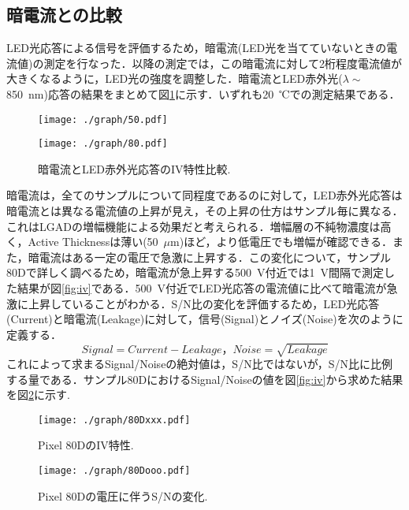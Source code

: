 \subsection{暗電流との比較}
\label{sub:leak}
LED光応答による信号を評価するため，暗電流(LED光を当てていないときの電流値)の測定を行なった．以降の測定では，この暗電流に対して2桁程度電流値が大きくなるように，LED光の強度を調整した．暗電流とLED赤外光($\lambda\sim$850~nm)応答の結果をまとめて図\ref{fig:leak}に示す．いずれも20~℃での測定結果である．\par
\begin{figure}[H]
\begin{minipage}{0.5\hsize}
	\centering
	\texttt{[image: ./graph/50.pdf]}
\end{minipage}
\begin{minipage}{0.5\hsize}
	\centering
	\texttt{[image: ./graph/80.pdf]}
\end{minipage}
 	\caption{暗電流とLED赤外光応答のIV特性比較.}
	\label{fig:leak}
\end{figure}
暗電流は，全てのサンプルについて同程度であるのに対して，LED赤外光応答は暗電流とは異なる電流値の上昇が見え，その上昇の仕方はサンプル毎に異なる．これはLGADの増幅機能による効果だと考えられる．増幅層の不純物濃度は高く，Active Thicknessは薄い(50~$\mu$m)ほど，より低電圧でも増幅が確認できる．また，暗電流はある一定の電圧で急激に上昇する．この変化について，サンプル80Dで詳しく調べるため，暗電流が急上昇する500~V付近では1~V間隔で測定した結果が図\ref{fig:iv}である．500~V付近でLED光応答の電流値に比べて暗電流が急激に上昇していることがわかる．S/N比の変化を評価するため，LED光応答(Current)と暗電流(Leakage)に対して，信号(Signal)とノイズ(Noise)を次のように定義する．
\[Signal=Current-Leakage，　Noise=\sqrt{Leakage}\]
これによって求まるSignal/Noiseの絶対値は，S/N比ではないが，S/N比に比例する量である．サンプル80DにおけるSignal/Noiseの値を図\ref{fig:iv}から求めた結果を図\ref{fig:sn}に示す.
\begin{figure}[H]
\begin{minipage}{0.5\hsize}
	\centering
	\texttt{[image: ./graph/80Dxxx.pdf]}
	 	\caption{Pixel 80DのIV特性.}
	\label{fig:iv}
\end{minipage}
\begin{minipage}{0.5\hsize}
	\centering
	\texttt{[image: ./graph/80Dooo.pdf]}
	 	\caption{Pixel 80Dの電圧に伴うS/Nの変化.}
	\label{fig:sn}
\end{minipage}
\end{figure}
